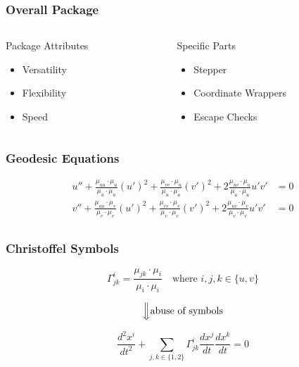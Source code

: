\documentclass{beamer}
\begin{document}
\begin{frame}
	
	\frametitle{Overall Package}
	
	\begin{columns}
		\begin{column}{0.5\textwidth}
			Package Attributes
			\begin{itemize}
				\item Versatility
				\item Flexibility
				\item Speed
			\end{itemize}
		\end{column}
		
		\begin{column}{0.5\textwidth}
			Specific Parts
			\begin{itemize}
				\item Stepper
				\item Coordinate Wrappers
				\item Escape Checks
			\end{itemize}
		\end{column}
	\end{columns}
	
\end{frame}


\begin{frame}
	
	\frametitle{Geodesic Equations}
	
	\begin{align*}
	u'' + \frac{\mu_{uu} \cdot \mu_u}{\mu_u \cdot \mu_u} (u')^2 + \frac{\mu_{vv} \cdot \mu_u}{\mu_u \cdot \mu_u} (v')^2 + 2\frac{\mu_{uv} \cdot \mu_u}{\mu_u \cdot \mu_u} u'v' & = 0 \\
	v'' + \frac{\mu_{uu} \cdot \mu_v}{\mu_v \cdot \mu_v} (u')^2 + \frac{\mu_{vv} \cdot \mu_v}{\mu_v \cdot \mu_v} (v')^2 + 2\frac{\mu_{uv} \cdot \mu_v}{\mu_v \cdot \mu_v} u'v' & = 0 \\
	\end{align*}
	
	
\end{frame}


\begin{frame}
	
	\frametitle{Christoffel Symbols}
	
	\begin{equation*} 
	\Gamma^i_{jk} = \frac{\mu_{jk}\cdot\mu_i}{\mu_i\cdot\mu_i} \quad\text{where } i,j,k \in \{u,v\}
	\end{equation*}
	
	$$\Big\Downarrow \text{abuse of symbols}$$
	
	\begin{equation*}
	\frac{d^2x^i}{dt^2} + \sum_{j,k \in \{1,2\}} \Gamma^i_{jk}\frac{dx^j}{dt}\frac{dx^k}{dt} = 0
	\end{equation*}
	
\end{frame}
\end{document}

